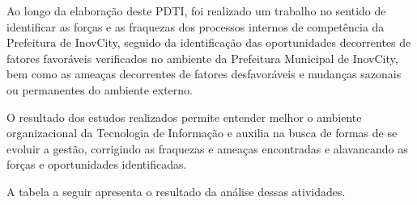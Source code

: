 \documentclass[        
    a4paper,          %
    12pt,             %
    chapter=TITLE,    %
    section=Title,    %
    subsection=Title, %
    oneside,          %
    english,          %
    spanish,          %
    brazil,           %
    sumario=abnt-6027-2012,
]{abntex2}
\newcommand{\EMPRESA}{Prefeitura de InovCity}
\newcommand{\CIDADE}{InovCity}
\begin{document}
Ao longo da elaboração deste PDTI, foi realizado um trabalho no sentido de identificar as forças e as fraquezas dos processos internos de 
competência da \EMPRESA{}, seguido da identificação das oportunidades decorrentes de fatores favoráveis verificados no ambiente da
Prefeitura Municipal de \CIDADE{}, bem como as ameaças decorrentes de fatores desfavoráveis e mudanças sazonais ou permanentes do ambiente 
externo.

O resultado dos estudos realizados permite entender melhor o ambiente organizacional da Tecnologia de Informação e auxilia na busca de 
formas de se evoluir a gestão, corrigindo as fraquezas e ameaças encontradas e alavancando as forças e oportunidades identificadas.

A tabela a seguir apresenta o resultado da análise dessas atividades.

\begin{table}[H]
\centering
\caption{Ambientes} \label{my-label}
\end{table}
\end{document}
